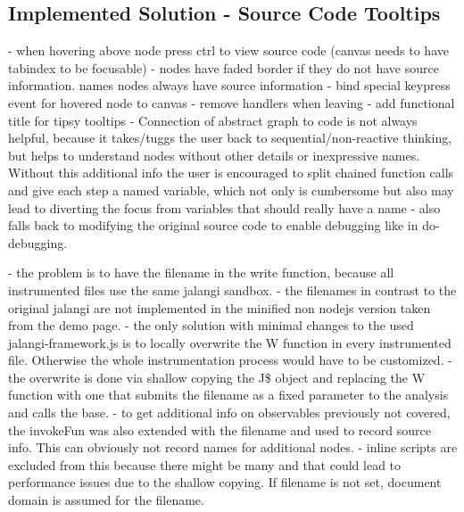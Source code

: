 	\subsection{Implemented Solution - Source Code Tooltips}
	- when hovering above node press ctrl to view source code (canvas needs to have tabindex to be focusable)
	- nodes have faded border if they do not have source information. names nodes always have source information
	- bind special keypress event for hovered node to canvas
	- remove handlers when leaving
	- add functional title for tipsy tooltips
	- Connection of abstract graph to code is not always helpful, because it takes/tuggs the user back to sequential/non-reactive thinking, but helps to understand nodes without other details or inexpressive names. Without this additional info the user is encouraged to split chained function calls and give each step a named variable, which not only is cumbersome but also may lead to diverting the focus from variables that should really have a name - also falls back to modifying the original source code to enable debugging like in do-debugging.
	
	
	- the problem is to have the filename in the write function, because all instrumented files use the same jalangi sandbox.
	- the filenames in contrast to the original jalangi are not implemented in the minified non nodejs version taken from the demo page.
	- the only solution with minimal changes to the used jalangi-framework.js is to locally overwrite the W function in every instrumented file. Otherwise the whole instrumentation process would have to be customized.
	- the overwrite is done via shallow copying the J\$ object and replacing the W function with one that submits the filename as a fixed parameter to the analysis and calls the base.
	- to get additional info on observables previously not covered, the invokeFun was also extended with the filename and used to record source info. This can obviously not record names for additional nodes.
	- inline scripts are excluded from this because there might be many and that could lead to performance issues due to the shallow copying.
	If filename is not set, document domain is assumed for the filename.
	
